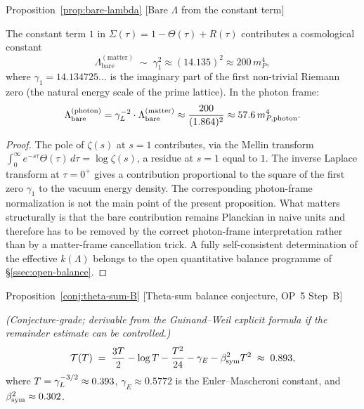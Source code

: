 \begin{qsarchived}{Proposition~\ref{prop:bare-lambda} [Bare $\Lambda$ from the constant term]}
\begin{proposition}

The constant term $1$ in $\Sigma(\tau) = 1 - \Theta(\tau) + R(\tau)$
contributes a cosmological constant
\[
 \Lambda_{\mathrm{bare}}^{(\mathrm{matter})}
 \;\sim\; \gamma_1^2 \approx (14.135)^2 \approx 200\,m_P^4,
\]
where $\gamma_1 = 14.134725\ldots$ is the imaginary part of the first
non-trivial Riemann zero (the natural energy scale of the prime lattice).
In the photon frame:
\[
 \Lambda_{\mathrm{bare}}^{(\mathrm{photon})}
 = \gamma_L^{-2}\cdot\Lambda_{\mathrm{bare}}^{(\mathrm{matter})}
 \approx \frac{200}{(1.864)^2} \approx 57.6\,m_{P,\mathrm{photon}}^4.
\]
\end{proposition}

\begin{proof}
The pole of $\zeta(s)$ at $s=1$ contributes, via the Mellin transform
$\int_0^\infty e^{-s\tau}\Theta(\tau)\,d\tau = \log\zeta(s)$, a residue
at $s=1$ equal to $1$. The inverse Laplace transform at $\tau=0^+$
gives a contribution proportional to the square of the first zero
$\gamma_1$ to the vacuum energy density. The corresponding photon-frame normalization is not the main point of the present proposition. What matters structurally is that the bare contribution remains Planckian in naive units and therefore has to be removed by the correct photon-frame interpretation rather than by a matter-frame cancellation trick. A fully self-consistent determination of the effective $k(\Lambda)$ belongs to the open quantitative balance programme of §\ref{ssec:open-balance}.
\end{proof}
\end{qsarchived}

\begin{qsarchived}{Proposition~\ref{conj:theta-sum-B} [Theta-sum balance conjecture, OP~5 Step~B]}
\begin{proposition}

\emph{(Conjecture-grade; derivable from the Guinand--Weil explicit
formula if the remainder estimate can be controlled.)}
\[
 \mathcal{T}(T)
 \;=\;
 \frac{3T}{2} - \log T - \frac{T^2}{24} - \gamma_E - \beta_{\mathrm{sym}}^2 T^2
 \;\approx\; 0.893,
\]
where $T = \gamma_L^{-3/2}\approx 0.393$, $\gamma_E\approx 0.5772$ is
the Euler--Mascheroni constant, and $\beta_{\mathrm{sym}}^2\approx 0.302$.
\end{proposition}
\end{qsarchived}

